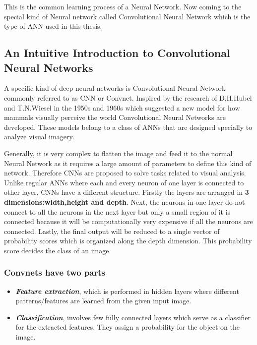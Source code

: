      This is the common learning process of a Neural Network\cite{IEEE118638}. Now coming to the special kind of Neural network called Convolutional Neural Network which is the type of ANN used in this thesis.
    \subsection{An Intuitive Introduction to Convolutional Neural Networks}
    A specific kind of deep neural networks is Convolutional Neural Network commonly referred to as CNN or Convnet. Inspired by the research of D.H.Hubel and T.N.Wiesel in the 1950s and 1960s which suggested a new model for how mammals visually perceive the world Convolutional Neural Networks are developed. These models belong to a class of ANNs that are designed specially to analyze visual imagery. %
    
    Generally, it is very complex to flatten the image and feed it to the normal Neural Network as it requires a large amount of parameters to define this kind of network. Therefore CNNs are proposed to solve tasks related to visual analysis. Unlike regular ANNs where each and every neuron of one layer is connected to other layer, CNNs have a different structure. Firstly the layers are arranged in \textbf{3 dimensions:width,height and depth}. Next, the neurons in one layer do not connect to all the neurons in the next layer but only a small region of it is connected because it will be computationally very expensive if all the neurons are connected. Lastly, the final output will be reduced to a single vector of probability scores which is organized along the depth dimension. This probability score decides the class of an image%
    
     
      \subsubsection{Convnets have two parts}
     \begin{itemize}
      \item \textit{\textbf{Feature extraction}}, which is performed in hidden layers where different patterns/features are learned from the given input image.
      \item \textit{\textbf{Classification}}, involves few fully connected layers which serve as a classifier for the extracted features. They assign a probability for the object on the image.
         
     \end{itemize}
